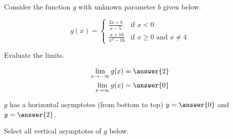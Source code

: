 \documentclass{ximera}
\author{Nela Lakos \and Kyle Parsons}
\begin{document}
\begin{exercise}

Consider the function $g$ with unknown parameter $b$ given below.

\[
g(x) = 
\begin{cases}
\frac{2x+b}{x-5} & \text{if } x<0\\
\frac{x+16}{x^2-16}  & \text{if } x\geq0 \text{ and } x\neq 4
\end{cases}
\]

Evaluate the limits.

\begin{align*}
\lim_{x\to-\infty}g(x) &= \answer{2}\\
\lim_{x\to\infty}g(x) &= \answer{0}
\end{align*}

\begin{exercise}

$g$ has a horizontal asymptotes (from bottom to top) $y=\answer{0}$ and $y=\answer{2}$.

\begin{exercise}

Select all vertical asymptotes of $g$ below.

\begin{selectAll}
\end{selectAll}

\end{exercise}
\end{exercise}
\end{exercise}
\end{document}
